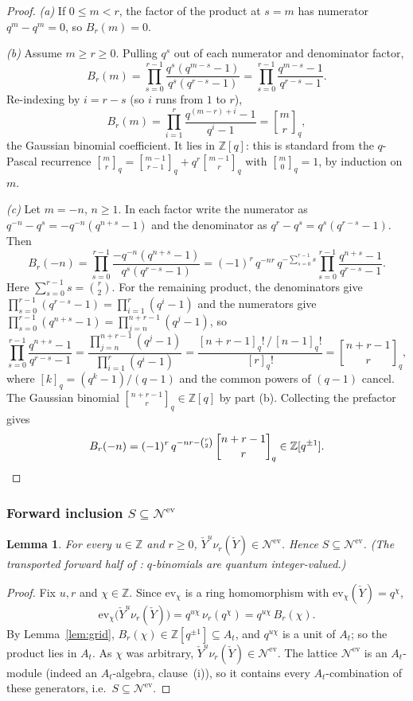 \documentclass[11pt]{article}
\newtheorem{lemma}{Lemma}
\newcommand{\At}{A_t}
\newcommand{\Nev}{\mathcal N^{\mathrm{ev}}}
\newcommand{\Yc}{\check Y}
\newcommand{\Z}{\mathbb Z}
\newcommand{\ev}{\mathrm{ev}}
\newcommand{\qbinom}[2]{\genfrac{[}{]}{0pt}{}{#1}{#2}_{q}}
\begin{document}
\begin{proof}
\emph{(a)}\; If $0\le m<r$, the factor of the product at $s=m$ has numerator
$q^{m}-q^{m}=0$, so $B_r(m)=0$.

\emph{(b)}\; Assume $m\ge r\ge0$. Pulling $q^{s}$ out of each numerator and
denominator factor,
\[
  B_r(m)=\prod_{s=0}^{r-1}\frac{q^{s}(q^{m-s}-1)}{q^{s}(q^{r-s}-1)}
        =\prod_{s=0}^{r-1}\frac{q^{m-s}-1}{q^{r-s}-1}.
\]
Re-indexing by $i=r-s$ (so $i$ runs from $1$ to $r$),
\[
  B_r(m)=\prod_{i=1}^{r}\frac{q^{(m-r)+i}-1}{q^{i}-1}=\qbinom{m}{r},
\]
the Gaussian binomial coefficient. It lies in $\Z[q]$: this is standard from the
$q$-Pascal recurrence $\qbinom{m}{r}=\qbinom{m-1}{r-1}+q^{r}\qbinom{m-1}{r}$ with
$\qbinom{m}{0}=1$, by induction on $m$.

\emph{(c)}\; Let $m=-n$, $n\ge1$. In each factor write the numerator as
$q^{-n}-q^{s}=-q^{-n}(q^{n+s}-1)$ and the denominator as
$q^{r}-q^{s}=q^{s}(q^{r-s}-1)$. Then
\[
  B_r(-n)=\prod_{s=0}^{r-1}\frac{-q^{-n}(q^{n+s}-1)}{q^{s}(q^{r-s}-1)}
        =(-1)^{r}\,q^{-nr}\,q^{-\sum_{s=0}^{r-1}s}
          \prod_{s=0}^{r-1}\frac{q^{n+s}-1}{q^{r-s}-1}.
\]
Here $\sum_{s=0}^{r-1}s=\binom{r}{2}$. For the remaining product, the
denominators give $\prod_{s=0}^{r-1}(q^{r-s}-1)=\prod_{i=1}^{r}(q^{i}-1)$ and the
numerators give $\prod_{s=0}^{r-1}(q^{n+s}-1)=\prod_{j=n}^{n+r-1}(q^{j}-1)$, so
\[
  \prod_{s=0}^{r-1}\frac{q^{n+s}-1}{q^{r-s}-1}
  =\frac{\prod_{j=n}^{n+r-1}(q^{j}-1)}{\prod_{i=1}^{r}(q^{i}-1)}
  =\frac{[n+r-1]_q!\,/\,[n-1]_q!}{[r]_q!}=\qbinom{n+r-1}{r},
\]
where $[k]_q=(q^{k}-1)/(q-1)$ and the common powers of $(q-1)$ cancel. The
Gaussian binomial $\qbinom{n+r-1}{r}\in\Z[q]$ by part (b). Collecting the
prefactor gives
\[
  B_r(-n)=(-1)^{r}\,q^{-nr-\binom{r}{2}}\,\qbinom{n+r-1}{r}\in\Z[q^{\pm1}].
  \qedhere
\]
\end{proof}

\subsubsection{Forward inclusion $S\subseteq\Nev$}

\begin{lemma}\label{lem:fwd}
For every $u\in\Z$ and $r\ge0$, $\Yc^{u}\nu_r(\Yc)\in\Nev$. Hence $S\subseteq\Nev$.
(The transported forward half of \cite[\S1]{HarmanHopkins}: $q$-binomials are
quantum integer-valued.)
\end{lemma}

\begin{proof}
Fix $u,r$ and $\chi\in\Z$. Since $\ev_\chi$ is a ring homomorphism with
$\ev_\chi(\Yc)=q^{\chi}$,
\[
  \ev_\chi\bigl(\Yc^{u}\nu_r(\Yc)\bigr)=q^{u\chi}\,\nu_r(q^{\chi})
  =q^{u\chi}\,B_r(\chi).
\]
By Lemma~\ref{lem:grid}, $B_r(\chi)\in\Z[q^{\pm1}]\subseteq\At$, and $q^{u\chi}$
is a unit of $\At$; so the product lies in $\At$. As $\chi$ was arbitrary,
$\Yc^{u}\nu_r(\Yc)\in\Nev$. The lattice $\Nev$ is an $\At$-module (indeed an
$\At$-algebra, clause~(i)), so it contains every $\At$-combination of these
generators, i.e.\ $S\subseteq\Nev$.
\end{proof}
\end{document}
